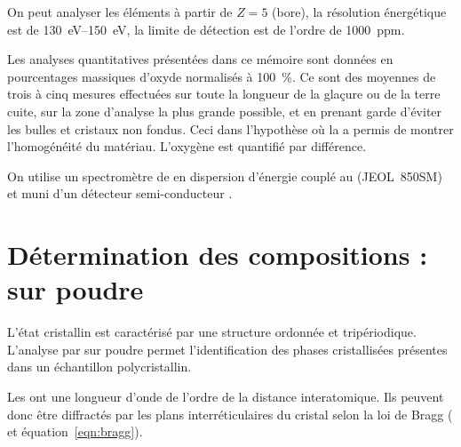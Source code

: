 On peut analyser les éléments à partir de $Z=5$ (bore), 
la résolution énergétique est de 
\SIrange[range-phrase=\ à\ ]{130}{150}{\electronvolt}, la limite de 
détection est de l'ordre de \SI{1000}{ppm}.

Les analyses quantitatives présentées dans ce mémoire sont données 
en pourcentages massiques d'oxyde normalisés à \SI{100}{\percent}. 
Ce sont des moyennes de trois à cinq mesures effectuées sur toute la 
longueur de la glaçure ou de la terre cuite, sur la zone d'analyse 
la plus grande possible, et en prenant garde d'éviter les bulles et 
cristaux non fondus. Ceci dans l'hypothèse où la \CL a permis de 
montrer l'homogénéité du matériau. L'oxygène est quantifié par 
différence.

On utilise un spectromètre de \RX en dispersion d'énergie couplé au 
\MEB (JEOL~850SM) et muni d'un détecteur semi-conducteur .

\section[Diffraction de \RX]
        {Détermination des compositions \cristallos : \DX sur poudre}

L'état cristallin est caractérisé par une structure ordonnée et 
tripériodique. L'analyse par \DX sur poudre permet l'identification 
des phases cristallisées présentes dans un échantillon polycristallin.

Les \RX ont une longueur d'onde de l'ordre de la distance 
interatomique. Ils peuvent donc être diffractés par les plans 
interréticulaires du cristal selon la loi de Bragg ( 
et équation~\ref{eqn:bragg}).





